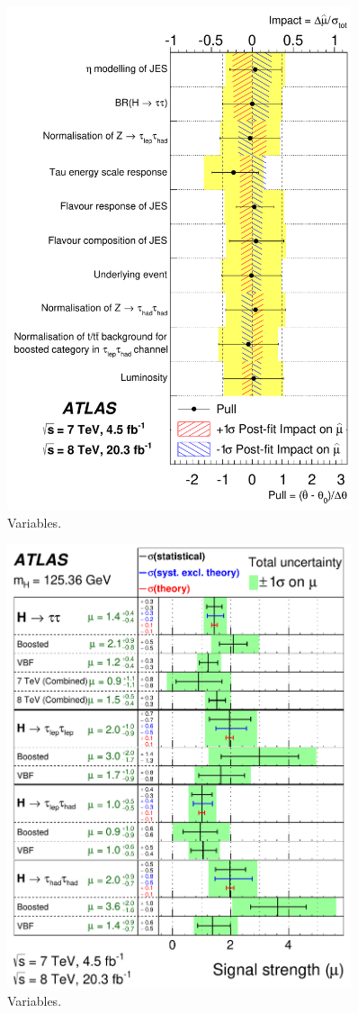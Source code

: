 \clearpage
\begin{figure}[tp]
  \centering
  \includegraphics[width=0.90\textwidth]{figures/HIGG-2013-32/fig_07}
  \caption{Variables.}
  \label{fig:results-uncertainties-2}
\end{figure}

\clearpage
\begin{figure}[tp]
  \centering
  \includegraphics[width=0.90\textwidth]{figures/HIGG-2013-32/fig_09}
  \caption{Variables.}
  \label{fig:results-musummary}
\end{figure}


